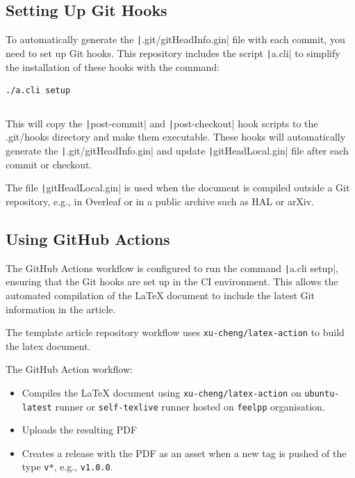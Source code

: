 \documentclass[a4paper]{article}
\begin{document}
\subsection{Setting Up Git Hooks}

To automatically generate the \texttt|.git/gitHeadInfo.gin| file with each commit, you need to set up Git hooks.
This repository includes the script \texttt|a.cli| to simplify the installation of these hooks with the command:

\begin{verbatim}
./a.cli setup
\end{verbatim}

\inputminted[linenos,autogobble,bgcolor=background,fontsize=\small,firstline=6,lastline=23]{sh}{a.cli}

This will copy the \texttt|post-commit| and \texttt|post-checkout| hook scripts to the .git/hooks directory and make them executable.
These hooks will automatically generate the \texttt|.git/gitHeadInfo.gin| and update \texttt|gitHeadLocal.gin| file after each commit or checkout.

The file \texttt|gitHeadLocal.gin| is used when the document is compiled outside a Git repository, e.g., in Overleaf or in a public archive such as HAL or arXiv.


\subsection{Using GitHub Actions}

The GitHub Actions workflow is configured to run the command \texttt|a.cli setup|, ensuring that the Git hooks are set up in the CI environment.
This allows the automated compilation of the \LaTeX{} document to include the latest Git information in the article.

The template article repository workflow uses \citep{cheng_xu_xu-chenglatex-action_2024} \texttt{xu-cheng/latex-action} to build the latex document.

The GitHub Action workflow:
\begin{itemize}
    \item Compiles the \LaTeX{} document using \texttt{xu-cheng/latex-action} on \texttt{ubuntu-latest} runner or \texttt{self-texlive} runner hosted on \texttt{feelpp} organisation.
    \item Uploads the resulting PDF
    \item Creates a release with the PDF as an asset when a new tag is pushed of the type \texttt{v*}, e.g., \texttt{v1.0.0}.
\end{itemize}
\end{document}

